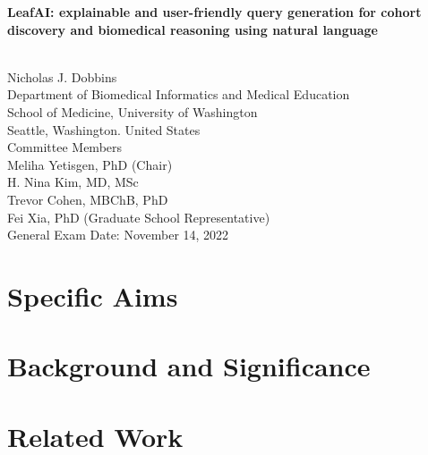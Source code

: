 \documentclass[12pt]{article} %
\begin{document}
\begin{titlepage}
    \begin{center}
        \vspace*{1cm}
        \begin{huge}
            \textbf{LeafAI: explainable and user-friendly query generation for cohort discovery and biomedical reasoning using natural language}
        \end{huge} \\
        \vspace{0.7cm}
        Nicholas J. Dobbins \\
        Department of Biomedical Informatics and Medical Education \\
        School of Medicine, University of Washington \\
        Seattle, Washington. United States \\
        \vspace{0.7cm}
        Committee Members \\
        Meliha Yetisgen, PhD (Chair) \\
        H. Nina Kim, MD, MSc \\
        Trevor Cohen, MBChB, PhD \\
        Fei Xia, PhD (Graduate School Representative) \\
        \vspace{0.7cm}
        General Exam Date: November 14, 2022
    \end{center}
\end{titlepage}

\tableofcontents
\thispagestyle{empty}
\newpage
\addtocounter{page}{-1}
 
\section{Specific Aims}
\label{sec:specific_aims}

\newpage

\section{Background and Significance}
\label{sec:background}


\section{Related Work}
\label{sec:related_work}

\end{document}
